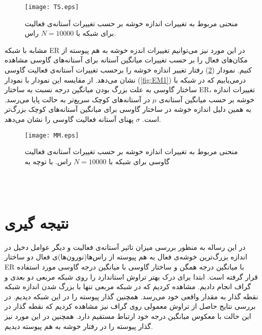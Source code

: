 \begin{figure}[htbp] 
\hspace*{0cm}
\centering
\texttt{[image: TS.eps]}
\caption [منحنی مربوط به تغییرات اندازه خوشه بر حسب تغییرات آستانه‌ی فعالیت مربوط به ساختار گاوسی]{\footnotesize منحنی مربوط به تغییرات اندازه خوشه بر حسب تغییرات آستانه‌ی فعالیت برای شبکه با $N=10000$ راس. }
\label{fig:TS}
\end{figure}
 \newpage
مشابه با شبکه ER در این مورد نیز می‌توانیم تغییرات اندزه خوشه به هم پیوسته از مکان‌های فعال را بر حسب تغییرات میانگین آستانه برای آستانه‌های گاوسی مشاهده کنیم.  نمودار (\ref{fig:MM1})  رفتار تغییر اندازه خوشه را برحسب تغییرات آستانه‌ی فعالیت گاوسی نشان می‌دهد. از مقایسه این نمودار با نمودار (\ref{fig:EM1}) درمی‌یابیم که در شبکه با ساختار گاوسی به علت بزرگ بودن میانگین درجه نسبت به ساختار ER، تغییرات اندازه خوشه بر حسب میانگین آستانه‌ی $\mu$ در آستانه‌های کوچک سریع‌تر به حالت پایا می‌رسد. به همین دلیل اندازه خوشه در ساختار گاوسی برای میانگین آستانه‌های کوچک بزرگ‌تر است. $\sigma$ پهنای آستانه فعالیت گاوسی را نشان می‌دهد.
\begin{figure}[htbp] 
\hspace*{0cm}
\centering
\texttt{[image: MM.eps]}
\caption [منحنی مربوط به تغییرات اندازه خوشه بر حسب تغییرات آستانه‌ی فعالیت گاوسی]{\footnotesize منحنی مربوط به تغییرات اندازه خوشه بر حسب تغییرات آستانه‌ی فعالیت گاوسی برای شبکه با $N=10000$ راس. با توچه به}
\label{fig:MM1}
\end{figure}\\\
 
\newpage
\section{نتیجه گیری}
در این رساله به منظور بررسی میزان تاثیر آستانه‌ی فعالیت و دیگر عوامل دخیل در اندازه بزرگ‌ترین خوشه‌ی فعال به هم پیوسته از راس‌ها(نورون‌ها)ی فعال دو ساختار ER با میانگین درجه همگن و ساختار گاوسی با میانگین درجه گاوسی مورد استفاده قرار گرفته است.  
ابتدا  برای درک بهتر تراوش استاندارد را روی شبکه مربعی دو بعدی  و گراف انجام دادیم. مشاهده کردیم که در شبکه مربعی  تنها با بزرگ شدن اندازه شبکه نقطه گذار به مقدار واقعی خود می‌رسد. همچنین گذار پیوسته را در این شبکه دیدیم.  در بررسی نتایج حاصل از تراوش معمولی روی گراف نیز مشاهده کردیم که نقطه گذار در این حالت با معکوس میانگین درجه خود ارتباط مستقیم دارد. همچنین در این مورد نیز گذار پیوسته را در رفتار خوشه به ‌هم پیوسته دیدیم. 


